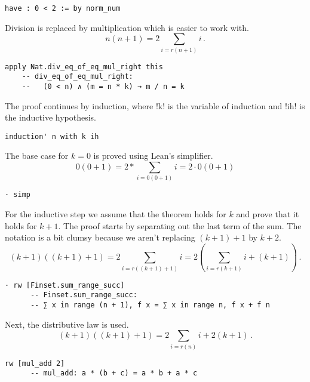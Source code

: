 \begin{Verbatim}[firstnumber=last]
  have : 0 < 2 := by norm_num
\end{Verbatim}


Division is replaced by multiplication which is easier to work with.
\[
n(n+1) = 2\sum_{i=r(n+1)} i\,.
\]
\begin{Verbatim}[firstnumber=last]
  apply Nat.div_eq_of_eq_mul_right this
    -- div_eq_of_eq_mul_right:
    --   (0 < n) ∧ (m = n * k) → m / n = k
\end{Verbatim}

The proof continues by induction, where !k! is the variable of induction and !ih! is the inductive hypothesis.
\begin{Verbatim}[firstnumber=last]
  induction' n with k ih
\end{Verbatim}


The base case for $k=0$ is proved using Lean's simplifier.
\[
0(0+1) = 2*\sum_{i=0(0+1)} i = 2\cdot 0(0+1)
\]
\begin{Verbatim}[firstnumber=last]
  · simp
\end{Verbatim}

For the inductive step we assume that the theorem holds for $k$ and prove that it holds for $k+1$. The proof starts by separating out the last term of the sum. The notation is a bit clumsy because we aren't replacing $(k+1)+1$ by $k+2$.
\[
(k+1)((k+1)+1)=2\sum_{i=r((k+1)+1)} i=2\left(\sum_{i=r(k+1)} i + (k+1)\right)\,.
\]
\begin{Verbatim}[firstnumber=last]
  · rw [Finset.sum_range_succ]
      -- Finset.sum_range_succ:
      -- ∑ x in range (n + 1), f x = ∑ x in range n, f x + f n
\end{Verbatim}

Next, the distributive law is used.
\[
(k+1)((k+1)+1)=2\sum_{i=r(n)} i + 2(k+1)\,.
\]
\begin{Verbatim}[firstnumber=last]
    rw [mul_add 2]
      -- mul_add: a * (b + c) = a * b + a * c
\end{Verbatim}

